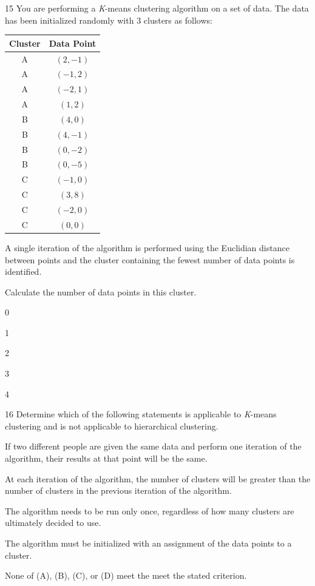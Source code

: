 \begin{question}{15}
You are performing a \textit{K}-means clustering algorithm on a set of data. The data has been initialized randomly with 3 clusters as follows:
\begin{center}
\begin{tabular}{|c|c|}
\hline
Cluster & Data Point \\ \hline
A & $(2, -1)$ \\ \hline
A & $(-1, 2)$ \\ \hline
A & $(-2, 1)$ \\ \hline
A & $(1, 2)$ \\ \hline
B & $(4, 0)$ \\ \hline
B & $(4, -1)$ \\ \hline
B & $(0, -2)$ \\ \hline
B & $(0, -5)$ \\ \hline
C & $(-1, 0)$ \\ \hline
C & $(3, 8)$ \\ \hline
C & $(-2, 0)$ \\ \hline
C & $(0, 0)$ \\ \hline
\end{tabular}
\end{center}

A single iteration of the algorithm is performed using the Euclidian distance between points and the cluster containing the fewest number of data points is identified.

Calculate the number of data points in this cluster.

\begin{choices}
\item 0
\item 1
\item 2
\item 3
\item 4
\end{choices}
\end{question}

\begin{question}{16}
Determine which of the following statements is applicable to \textit{K}-means clustering and is not applicable to hierarchical clustering.

\begin{choices}
\item If two different people are given the same data and perform one iteration of the algorithm, their results at that point will be the same.
\item At each iteration of the algorithm, the number of clusters will be greater than the number of clusters in the previous iteration of the algorithm.
\item The algorithm needs to be run only once, regardless of how many clusters are ultimately decided to use.
\item The algorithm must be initialized with an assignment of the data points to a cluster.
\item None of (A), (B), (C), or (D) meet the meet the stated criterion.
\end{choices}
\end{question}

